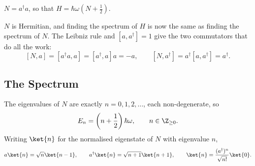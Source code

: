 \begin{definition}
    $N = a^\dagger a$, so that $H = \hbar\omega\left(N + \frac{1}{2}\right)$.
\end{definition}

$N$ is Hermitian, and finding the spectrum of $H$ is now the same as finding the spectrum of $N$. The Leibniz rule and $[a,a^\dagger]=1$ give the two commutators that do all the work:
$$
[N, a] = [a^\dagger a, a] = [a^\dagger, a] a = -a, \qquad [N, a^\dagger] = a^\dagger [a, a^\dagger] = a^\dagger.
$$

\subsection{The Spectrum}

\begin{theorem}
    The eigenvalues of $N$ are exactly $n = 0, 1, 2, \dots$, each non-degenerate, so
    $$
    E_n = \left(n + \frac{1}{2}\right)\hbar\omega, \qquad n \in \Z_{\geq 0}.
    $$
    Writing $\ket{n}$ for the normalised eigenstate of $N$ with eigenvalue $n$,
    $$
    a\ket{n} = \sqrt{n}\ket{n-1}, \qquad a^\dagger \ket{n} = \sqrt{n+1}\ket{n+1}, \qquad \ket{n} = \frac{(a^\dagger)^n}{\sqrt{n!}}\ket{0}.
    $$
\end{theorem}
